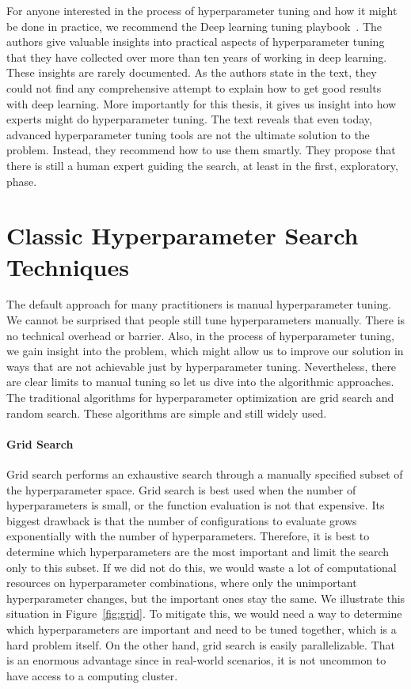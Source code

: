 For anyone interested in the process of hyperparameter tuning and how it might be done in practice, we recommend the Deep learning tuning playbook~\cite{tuningplaybookgithub}. The authors give valuable insights into practical aspects of hyperparameter tuning that they have collected over more than ten years of working in deep learning. These insights are rarely documented. As the authors state in the text, they could not find any comprehensive attempt to explain how to get good results with deep learning. More importantly for this thesis, it gives us insight into how experts might do hyperparameter tuning. The text reveals that even today, advanced hyperparameter tuning tools are not the ultimate solution to the problem. Instead, they recommend how to use them smartly. They propose that there is still a human expert guiding the search, at least in the first, exploratory, phase.



\section{Classic Hyperparameter Search Techniques}
The default approach for many practitioners is manual hyperparameter tuning. We cannot be surprised that people still tune hyperparameters manually. There is no technical overhead or barrier. Also, in the process of hyperparameter tuning, we gain insight into the problem, which might allow us to improve our solution in ways that are not achievable just by hyperparameter tuning. Nevertheless, there are clear limits to manual tuning so let us dive into the algorithmic approaches. The traditional algorithms for hyperparameter optimization are grid search and random search. These algorithms are simple and still widely used.

\paragraph{Grid Search} Grid search performs an exhaustive search through a manually specified subset of the hyperparameter space. Grid search is best used when the number of hyperparameters is small, or the function evaluation is not that expensive. Its biggest drawback is that the number of configurations to evaluate grows exponentially with the number of hyperparameters. Therefore, it is best to determine which hyperparameters are the most important and limit the search only to this subset. If we did not do this, we would waste a lot of computational resources on hyperparameter combinations, where only the unimportant hyperparameter changes, but the important ones stay the same. We illustrate this situation in Figure~\ref{fig:grid}. To mitigate this, we would need a way to determine which hyperparameters are important and need to be tuned together, which is a hard problem itself. On the other hand, grid search is easily parallelizable. That is an enormous advantage since in real-world scenarios, it is not uncommon to have access to a computing cluster.

